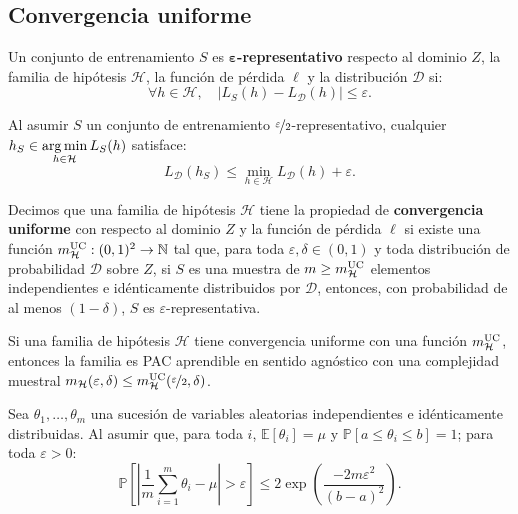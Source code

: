 \documentclass[8pt,a4paper]{extarticle}
\begin{document}
\begin{multicols}{3}
\newpage

\section{Convergencia uniforme}

\begin{boxdef}
	Un conjunto de entrenamiento $S$ es \textbf{$\bm{\varepsilon}$-representativo} respecto al dominio $Z$, la familia de hipótesis $\mathcal{H}$, la función de pérdida $ \ell$ y la distribución $\mathcal{D}$ si:
	\[
		\forall h \in \mathcal{H}, \quad \left| L_S (h) - L_{\mathcal{D}} (h) \right| \le \varepsilon
	.\] 
\end{boxdef}

\begin{boxlemma}[]
	Al asumir $S$ un conjunto de entrenamiento $\nicefrac{\varepsilon}{2}$-representativo, cualquier $\displaystyle h_{S} \in \operatorname*{\arg \min}_{h \in \mathcal{H}} L_{S} (h)$ satisface:
	\[
		L_{\mathcal{D}}(h_{S}) \le \min_{h \in \mathcal{H}} L_{\mathcal{D}} (h) + \varepsilon
	.\] 
\end{boxlemma}

\begin{boxdef}
	Decimos que una familia de hipótesis $\mathcal{H}$ tiene la propiedad de \textbf{convergencia uniforme} con respecto al dominio $Z$ y la función de pérdida  $ \ell$ si existe una función $m_{\mathcal{H}}^{\text{\normalfont UC}} : (0,1)^2 \to \mathbb{N}$ tal que, para toda $\varepsilon, \delta \in (0,1)$ y toda distribución de probabilidad  $\mathcal{D}$ sobre $Z$, si $S$ es una muestra de  $m \ge m_{\mathcal{H}}^{\text{\normalfont UC}}$ elementos independientes e idénticamente distribuidos por $\mathcal{D}$, entonces, con probabilidad de al menos $(1 - \delta)$,  $S$ es $\varepsilon$-representativa.
\end{boxdef}

\begin{boxcor}[]
	Si una familia de hipótesis $\mathcal{H}$ tiene convergencia uniforme con una función $m_{\mathcal{H}}^{\text{\normalfont UC}}$, entonces la familia es PAC aprendible en sentido agnóstico con una complejidad muestral $m_{\mathcal{H}} (\varepsilon, \delta) \le m_{\mathcal{H}}^{\text{\normalfont UC}} (\nicefrac{\varepsilon}{2}, \delta)$.
\end{boxcor}

\begin{boxlemma}
	Sea $\theta_1, \ldots, \theta_m$ una sucesión de variables aleatorias independientes e idénticamente distribuidas. Al asumir que, para toda $i$, $\mathbb{E}[\theta_i] = \mu$ y $\mathbb{P}[a \le \theta_i \le b] = 1$; para toda $\varepsilon > 0$:
	 \[
		 \mathbb{P} \left[ \left| \frac{1}{m} \sum_{i = 1}^{m} \theta_i - \mu \right| > \varepsilon \right] \le 2 \exp \left( \frac{-2m \varepsilon^2}{(b - a)^2} \right) 
	.\] 
\end{boxlemma}


\end{multicols}
\end{document}
